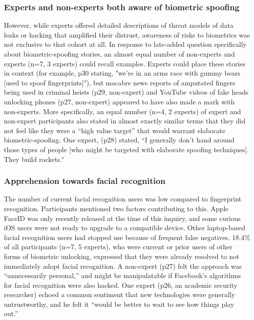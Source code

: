 \subsubsection{Experts and non-experts both aware of biometric spoofing}
However, while experts offered detailed descriptions of threat models of data leaks or hacking that amplified their distrust, awareness of risks to biometrics was not exclusive to that cohort at all. In response to late-added question specifically about biometric-spoofing stories, an almost equal number of non-experts and experts (n=7, 3 experts) could recall examples. Experts could place these stories in context (for example, p30 stating, "we're in an arms race with gummy bears [used to spoof fingerprints]"), but macabre news reports of amputated fingers being used in criminal heists (p29, non-expert) and YouTube videos of fake heads unlocking phones (p27, non-expert) appeared to have also made a mark with non-experts. More specifically, an equal number (n=4, 2 experts) of expert and non-expert participants also stated in almost exactly similar terms that they did not feel like they were a ``high value target'' that would warrant elaborate biometric-spoofing. One expert, (p28) stated, ``I generally don't hand around those types of people [who might be targeted with elaborate spoofing techniques]. They build rockets.'' 

\subsubsection{Apprehension towards facial recognition}
The number of current facial recognition users was low compared to fingerprint recognition. Participants mentioned two factors contributing to this. Apple FaceID was only recently released at the time of this inquiry, and some curious iOS users were not ready to upgrade to a compatible device. Other laptop-based facial recognition users had stopped use because of frequent false negatives. 18.4\% of all participants (n=7, 5 experts), who were current or prior users of other forms of biometric unlocking, expressed that they were already resolved to not immediately adopt facial recognition. A non-expert (p27) felt the approach was ``unnecessarily personal,'' and might be manipulatable if Facebook's algorithms for facial recognition were also hacked. One expert (p26, an academic security researcher) echoed a common sentiment that new technologies were generally untrustworthy, and he felt it ``would be better to wait to see how things play out.''

